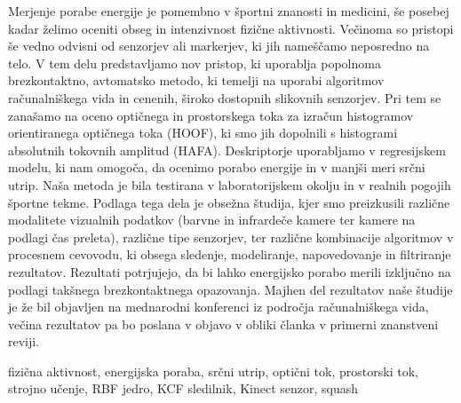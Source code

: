 \povzetekp
Merjenje porabe energije je pomembno v športni znanosti in medicini, še posebej kadar želimo oceniti obseg in intenzivnost fizične aktivnosti. Večinoma so pristopi še vedno odvisni od senzorjev ali markerjev, ki jih nameščamo neposredno na telo. V tem delu predstavljamo nov pristop, ki uporablja popolnoma brezkontaktno, avtomatsko metodo, ki temelji na uporabi algoritmov računalniškega vida in cenenih, široko dostopnih slikovnih senzorjev. Pri tem se zanašamo na oceno optičnega in prostorskega toka za izračun histogramov orientiranega optičnega toka (HOOF), ki smo jih dopolnili s histogrami absolutnih tokovnih amplitud (HAFA). Deskriptorje uporabljamo v regresijskem modelu, ki nam omogoča, da ocenimo porabo energije in v manjši meri srčni utrip. Naša metoda je bila testirana v laboratorijskem okolju in v realnih pogojih športne tekme. Podlaga tega dela je obsežna študija, kjer smo preizkusili različne modalitete vizualnih podatkov (barvne in infrardeče kamere ter kamere na podlagi čas preleta), različne tipe senzorjev, ter različne kombinacije algoritmov v procesnem cevovodu, ki obsega sledenje, modeliranje, napovedovanje in filtriranje rezultatov.
Rezultati potrjujejo, da bi lahko energijsko porabo merili izključno na podlagi takšnega brezkontaktnega opazovanja. Majhen del rezultatov naše študije je že bil objavljen na mednarodni konferenci iz področja računalniškega vida, večina rezultatov pa bo poslana v objavo v obliki članka v primerni znanstveni reviji.

\kljucnebesede fizična aktivnost, energijska poraba, srčni utrip, optični tok, prostorski tok, strojno učenje, RBF jedro, KCF sledilnik, Kinect senzor, squash